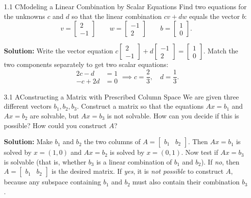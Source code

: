 \documentclass[11pt,a4paper,openany,oneside]{book}
\def\vect#1{#1}%
\def\mathbf#1{#1}%
\newcommand{\vect}[1]{\mathbf{#1}}
\numberwithin{equation}{chapter}
\begin{document}
\begin{example}{1.1 C}{Modeling a Linear Combination by Scalar Equations}
Find two equations for the unknowns $c$ and $d$ so that the linear combination $c\vect{v} + d\vect{w}$ equals the vector $\vect{b}$:
\[
\vect{v} = \begin{bmatrix} 2 \\ -1 \end{bmatrix} \qquad \vect{w} = \begin{bmatrix} -1 \\ 2 \end{bmatrix} \qquad \vect{b} = \begin{bmatrix} 1 \\ 0 \end{bmatrix}.
\]
\end{example}
\textbf{Solution:} Write the vector equation $c\begin{bmatrix}2\\-1\end{bmatrix} + d\begin{bmatrix}-1\\2\end{bmatrix} = \begin{bmatrix}1\\0\end{bmatrix}$. Match the two components separately to get two scalar equations:
\[
\begin{aligned}
2c - d &= 1 \\
-c + 2d &= 0
\end{aligned}
\implies c = \frac{2}{3}, \quad d = \frac{1}{3}.
\]

\begin{example}{3.1 A}{Constructing a Matrix with Prescribed Column Space}
We are given three different vectors $\vect{b}_1, \vect{b}_2, \vect{b}_3$. Construct a matrix so that the equations $A\vect{x} = \vect{b}_1$ and $A\vect{x} = \vect{b}_2$ are solvable, but $A\vect{x} = \vect{b}_3$ is not solvable. How can you decide if this is possible? How could you construct $A$?
\end{example}
\textbf{Solution:} Make $\vect{b}_1$ and $\vect{b}_2$ the two columns of $A = \begin{bmatrix}\vect{b}_1 & \vect{b}_2\end{bmatrix}$. Then $A\vect{x}=\vect{b}_1$ is solved by $\vect{x}=(1,0)$ and $A\vect{x}=\vect{b}_2$ is solved by $\vect{x}=(0,1)$. Now test if $A\vect{x}=\vect{b}_3$ is solvable (that is, whether $\vect{b}_3$ is a linear combination of $\vect{b}_1$ and $\vect{b}_2$). If \emph{no}, then $A = \begin{bmatrix}\vect{b}_1 & \vect{b}_2\end{bmatrix}$ is the desired matrix. If \emph{yes}, it is \emph{not possible} to construct $A$, because any subspace containing $\vect{b}_1$ and $\vect{b}_2$ must also contain their combination $\vect{b}_3$.
\end{document}
